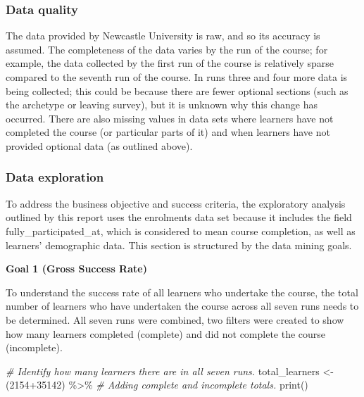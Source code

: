 \documentclass[
]{article}
\newenvironment{Shaded}{\begin{snugshade}}{\end{snugshade}}
\newcommand{\CommentTok}[1]{\textcolor[rgb]{0.56,0.35,0.01}{\textit{#1}}}
\newcommand{\DecValTok}[1]{\textcolor[rgb]{0.00,0.00,0.81}{#1}}
\newcommand{\FunctionTok}[1]{\textcolor[rgb]{0.00,0.00,0.00}{#1}}
\newcommand{\NormalTok}[1]{#1}
\newcommand{\OtherTok}[1]{\textcolor[rgb]{0.56,0.35,0.01}{#1}}
\newcommand{\SpecialCharTok}[1]{\textcolor[rgb]{0.00,0.00,0.00}{#1}}
\begin{document}
\hypertarget{data-quality}{%
\subsubsection{Data quality}\label{data-quality}}

The data provided by Newcastle University is raw, and so its accuracy is
assumed. The completeness of the data varies by the run of the course;
for example, the data collected by the first run of the course is
relatively sparse compared to the seventh run of the course. In runs
three and four more data is being collected; this could be because there
are fewer optional sections (such as the archetype or leaving survey),
but it is unknown why this change has occurred. There are also missing
values in data sets where learners have not completed the course (or
particular parts of it) and when learners have not provided optional
data (as outlined above).

\hypertarget{data-exploration}{%
\subsubsection{Data exploration}\label{data-exploration}}

To address the business objective and success criteria, the exploratory
analysis outlined by this report uses the enrolments data set because it
includes the field fully\_participated\_at, which is considered to mean
course completion, as well as learners' demographic data. This section
is structured by the data mining goals.

\textbf{Goal 1 (Gross Success Rate)}

To understand the success rate of all learners who undertake the course,
the total number of learners who have undertaken the course across all
seven runs needs to be determined. All seven runs were combined, two
filters were created to show how many learners completed (complete) and
did not complete the course (incomplete).

\begin{Shaded}
\begin{Highlighting}[]
\CommentTok{\# Identify how many learners there are in all seven runs.}
\NormalTok{total\_learners }\OtherTok{\textless{}{-}}\NormalTok{ (}\DecValTok{2154}\SpecialCharTok{+}\DecValTok{35142}\NormalTok{) }\SpecialCharTok{\%\textgreater{}\%} \CommentTok{\# Adding complete and incomplete totals.}
  \FunctionTok{print}\NormalTok{()}
\end{Highlighting}
\end{Shaded}
\end{document}
